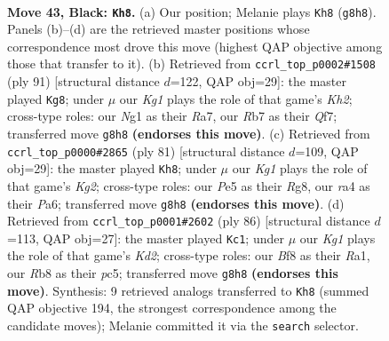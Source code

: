 \documentclass[11pt]{article}
\begin{document}
\clearpage

\begin{figure}[p]\centering
\begin{subfigure}{0.46\textwidth}\centering
\resizebox{\linewidth}{!}{%
\newchessgame
\chessboard[
  setfen={1r3bk1/1r3p2/2Q5/1n2pR2/R3P3/3KB3/3N2N1/6nq b - - 11 43},
  showmover=false,
  pgfstyle=straightmove, color=movearrow, markmove={g8-h8}
]}
\caption{}
\end{subfigure}\hfill
\begin{subfigure}{0.46\textwidth}\centering
\resizebox{\linewidth}{!}{%
\newchessgame
\chessboard[
  setfen={8/r3rqpk/8/4R3/5P1p/1npQB2P/3p2PK/3R4 b - - 3 46},
  showmover=false,
  pgfstyle=straightmove, color=movearrow, markmove={h7-g8}
]}
\caption{}
\end{subfigure}
\\[4pt]
\begin{subfigure}{0.46\textwidth}\centering
\resizebox{\linewidth}{!}{%
\newchessgame
\chessboard[
  setfen={6r1/6k1/p4r1p/1pq3n1/3N2R1/3Q4/1PP5/1K5R b - - 9 41},
  showmover=false,
  pgfstyle=straightmove, color=movearrow, markmove={g7-h8}
]}
\caption{}
\end{subfigure}\hfill
\begin{subfigure}{0.46\textwidth}\centering
\resizebox{\linewidth}{!}{%
\newchessgame
\chessboard[
  setfen={q7/4rpk1/5n2/P1p2Q2/5N2/6P1/3K1P1r/R4R2 w - - 0 44},
  showmover=false,
  pgfstyle=straightmove, color=movearrow, markmove={d2-c1}
]}
\caption{}
\end{subfigure}
\caption{\textbf{Move 43, Black: \texttt{Kh8}.} (a) Our position; Melanie plays \texttt{Kh8} (\texttt{g8h8}). Panels (b)--(d) are the retrieved master positions whose correspondence most drove this move (highest QAP objective among those that transfer to it). (b) Retrieved from \texttt{ccrl\_top\_p0002\#1508} (ply 91) [structural distance $d$=122, QAP obj=29]: the master played \texttt{Kg8}; under $\mu$ our \emph{Kg1} plays the role of that game's \emph{Kh2}; cross-type roles: our \emph{N}g1 as their \emph{R}a7, our \emph{R}b7 as their \emph{Q}f7; transferred move \texttt{g8h8} \textbf{(endorses this move)}. (c) Retrieved from \texttt{ccrl\_top\_p0000\#2865} (ply 81) [structural distance $d$=109, QAP obj=29]: the master played \texttt{Kh8}; under $\mu$ our \emph{Kg1} plays the role of that game's \emph{Kg2}; cross-type roles: our \emph{P}e5 as their \emph{R}g8, our \emph{r}a4 as their \emph{P}a6; transferred move \texttt{g8h8} \textbf{(endorses this move)}. (d) Retrieved from \texttt{ccrl\_top\_p0001\#2602} (ply 86) [structural distance $d$=113, QAP obj=27]: the master played \texttt{Kc1}; under $\mu$ our \emph{Kg1} plays the role of that game's \emph{Kd2}; cross-type roles: our \emph{B}f8 as their \emph{R}a1, our \emph{R}b8 as their \emph{p}c5; transferred move \texttt{g8h8} \textbf{(endorses this move)}. Synthesis: 9 retrieved analogs transferred to \texttt{Kh8} (summed QAP objective 194, the strongest correspondence among the candidate moves); Melanie committed it via the \texttt{search} selector.}
\label{fig:thought-m85}
\end{figure}
\end{document}
